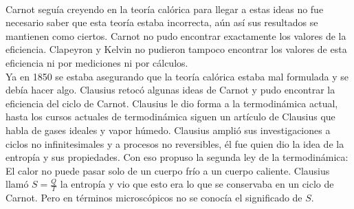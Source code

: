 \\
Carnot seguía creyendo en la teoría calórica para llegar a estas ideas no fue necesario saber que esta teoría estaba incorrecta, aún así sus resultados se mantienen como ciertos. Carnot no pudo encontrar exactamente los valores de la eficiencia. Clapeyron y Kelvin no pudieron tampoco encontrar los valores de esta eficiencia ni por mediciones ni por cálculos. 
\\
Ya en 1850 se estaba asegurando que la teoría calórica estaba mal formulada y se debía hacer algo. Clausius retocó algunas ideas de Carnot y pudo encontrar la eficiencia del ciclo de Carnot. Clausius le dio forma a la termodinámica actual, hasta los cursos actuales de termodinámica siguen un artículo de Clausius que habla de gases ideales y vapor húmedo. Clausius amplió sus investigaciones a ciclos no infinitesimales y a procesos no reversibles, él fue quien dio la idea de la entropía y sus propiedades. Con eso propuso la segunda ley de la termodinámica: El calor no puede pasar solo de un cuerpo frío a un cuerpo caliente. Clausius llamó $S=\frac{Q}{T}$ la entropía y vio que esto era lo que se conservaba en un ciclo de Carnot. Pero en términos microscópicos no se conocía el significado de $S$.
\\
